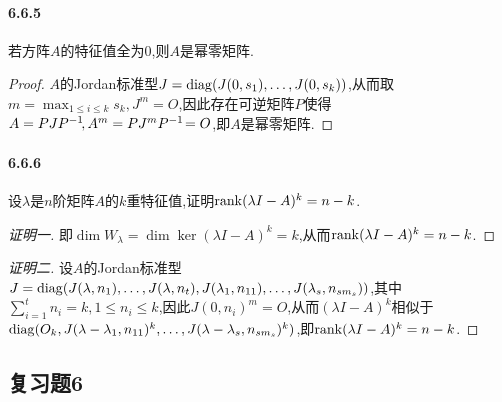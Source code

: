 \documentclass[11pt]{article}
\begin{document}
\paragraph{6.6.5}若方阵$A$的特征值全为0,则$A$是幂零矩阵.
\begin{proof}
    $A$的Jordan标准型$J=\operatorname{diag}(J(0,s_1),\dots,J(0,s_k))$,从而取$m=\max_{1\leq i\leq k}s_k, J^m=O$,因此存在可逆矩阵$P$使得$A=PJP^{-1}\!, A^m=PJ^mP^{-1}\!=O$,即$A$是幂零矩阵.
\end{proof}
\paragraph{6.6.6}设$\lambda$是$n$阶矩阵$A$的$k$重特征值,证明$\operatorname{rank}(\lambda I-A)^k=n-k$.
\begin{proof}[证明一]
    即$\dim W_{\lambda}=\dim\ker(\lambda I-A)^k=k$,从而$\operatorname{rank}(\lambda I-A)^k=n-k$.
\end{proof}
\begin{proof}[证明二]
    设$A$的Jordan标准型$J=\operatorname{diag}(J(\lambda,n_1),\dots,J(\lambda,n_t),J(\lambda_1,n_{11}),\dots,J(\lambda_s,n_{sm_s}))$,其中$\sum_{i=1}^t n_i=k, 1\leq n_i\leq k$,因此$J(0,n_i)^m=O$,从而$(\lambda I-A)^k$相似于$\operatorname{diag}(O_k,J(\lambda-\lambda_1,n_{11})^k,\dots,J(\lambda-\lambda_s,n_{sm_s})^k)$,即$\operatorname{rank} (\lambda I-A)^k=n-k$.
\end{proof}

\subsection{复习题6}
\end{document}
